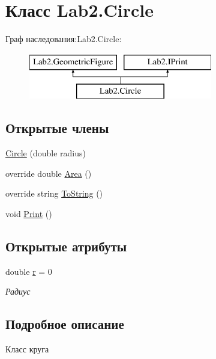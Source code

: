 \hypertarget{class_lab2_1_1_circle}{}\section{Класс Lab2.\+Circle}
\label{class_lab2_1_1_circle}
Граф наследования\+:Lab2.\+Circle\+:\begin{figure}[H]
\begin{center}
\leavevmode
\includegraphics[height=2.000000cm]{class_lab2_1_1_circle}
\end{center}
\end{figure}
\subsection*{Открытые члены}
\begin{DoxyCompactItemize}
\item 
\hyperlink{class_lab2_1_1_circle_ac95d3e44e178cf6199237fc74698465c}{Circle} (double radius)
\item 
override double \hyperlink{class_lab2_1_1_circle_afe38ef7cc9ce4b02a6e640d3029e5962}{Area} ()
\item 
override string \hyperlink{class_lab2_1_1_circle_ab2ed9c25791cb878a8a8d8857786917d}{To\+String} ()
\item 
void \hyperlink{class_lab2_1_1_circle_a300cdfbc89e35dadfdcd35ff085ffc13}{Print} ()
\end{DoxyCompactItemize}
\subsection*{Открытые атрибуты}
\begin{DoxyCompactItemize}
\item 
\mbox{\label{class_lab2_1_1_circle_a5a40103bb404c90294370219a5cec078}} 
double \hyperlink{class_lab2_1_1_circle_a5a40103bb404c90294370219a5cec078}{r} = 0
\begin{DoxyCompactList}\small\item\em Радиус \end{DoxyCompactList}\end{DoxyCompactItemize}


\subsection{Подробное описание}
Класс круга 

